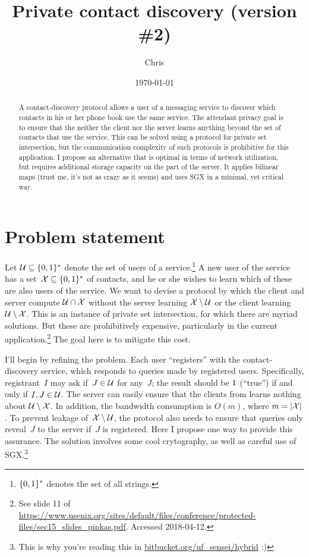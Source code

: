 \documentclass{build/llncs}
\date{\today}
\title{Private contact discovery ({\color{thegray}version \#2})}
\author{Chris}
\institute{}
\begin{document}
\maketitle

\begin{abstract}
  A contact-discovery protocol allows a user of a messaging service to discover
  which contacts in his or her phone book use the same service. The attendant
  privacy goal is to ensure that the neither the client nor the server learns
  anything beyond the set of contacts that use the service.
  This can be solved using a protocol for private set intersection, but the
  communication complexity of such protocols is prohibitive for this
  application.
  I propose an alternative that is optimal in terms of network utilization,
  but requires additional storage capacity on the part of the server. It applies
  bilinear maps (trust me, it's not as crazy as it seems) and uses SGX in a
  minimal, yet critical way.
\end{abstract}

\section*{Problem statement}

Let $\mathcal{U} \subseteq \{0,1\}^*$ denote the set of users of a
service.\footnote{$\{0,1\}^*$ denotes the set of all strings.}
%
A new user of the service has a set~$\mathcal{X} \subseteq \{0,1\}^*$ of contacts, and he
or she wishes to learn which of these are also users of the service.
%
We want to devise a protocol by which the client and server compute $\mathcal{U}
\cap \mathcal{X}$ without the server learning $\mathcal{X} \setminus \mathcal{U}$ or the client
learning $\mathcal{U} \setminus \mathcal{X}$.
%
This is an instance of private set intersection, for which there are myriad
solutions. But these are prohibitively expensive, particularly in the current
application.\footnote{See slide 11 of
\url{https://www.usenix.org/sites/default/files/conference/protected-files/sec15_slides_pinkas.pdf}.
Accessed 2018-04-12.}
%
The goal here is to mitigate this cost.

I'll begin by refining the problem. Each user ``registers'' with the
contact-discovery service, which responds to queries made by registered users.
%
Specifically, registrant~$I$ may ask if~$J\in\mathcal{U}$ for any~$J$; the result should
be $1$ (``true'') if and only if $I, J \in \mathcal{U}$.
%
The server can easily ensure that the clients from learns nothing about $\mathcal{U}
\setminus \mathcal{X}$. In addition, the bandwidth consumption is $O(m)$, where $m=|\mathcal{X}|$.
%
To prevent leakage of~$\mathcal{X} \setminus \mathcal{U}$, the protocol also needs to ensure that
queries only reveal~$J$ to the server if~$J$ is registered. Here I propose one
way to provide this assurance. The solution involves some cool crytography, as
well as careful use of SGX.\footnote{This is why you're reading this in
\url{bitbucket.org/uf_sensei/hybrid} :)}
\end{document}
